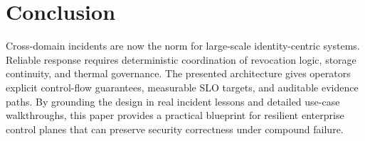 \documentclass[12pt]{article}
\begin{document}
\section{Conclusion}
Cross-domain incidents are now the norm for large-scale identity-centric systems. Reliable response requires deterministic coordination of revocation logic, storage continuity, and thermal governance. The presented architecture gives operators explicit control-flow guarantees, measurable SLO targets, and auditable evidence paths. By grounding the design in real incident lessons and detailed use-case walkthroughs, this paper provides a practical blueprint for resilient enterprise control planes that can preserve security correctness under compound failure.



\end{document}
